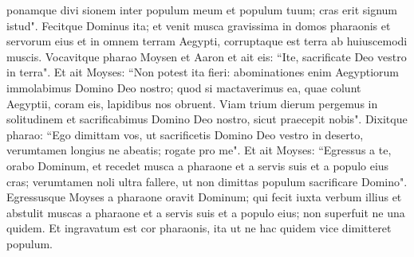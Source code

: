 \begin{biblechapter}
\verse ponamque divi sionem inter populum meum et populum tuum; cras erit signum istud". 
\verse Fecitque Dominus ita; et venit musca gravissima in domos pharaonis et servorum eius et in omnem terram Aegypti, corruptaque est terra ab huiuscemodi muscis. 
\verse Vocavitque pharao Moysen et Aaron et ait eis: “Ite, sacrificate Deo vestro in terra". 
\verse Et ait Moyses: “Non potest ita fieri: abominationes enim Aegyptiorum immolabimus Domino Deo nostro; quod si mactaverimus ea, quae colunt Aegyptii, coram eis, lapidibus nos obruent. 
\verse Viam trium dierum pergemus in solitudinem et sacrificabimus Domino Deo nostro, sicut praecepit nobis". 
\verse Dixitque pharao: “Ego dimittam vos, ut sacrificetis Domino Deo vestro in deserto, verumtamen longius ne abeatis; rogate pro me". 
\verse Et ait Moyses: “Egressus a te, orabo Dominum, et recedet musca a pharaone et a servis suis et a populo eius cras; verumtamen noli ultra fallere, ut non dimittas populum sacrificare Domino". 
\verse Egressusque Moyses a pharaone oravit Dominum;  
\verse qui fecit iuxta verbum illius et abstulit muscas a pharaone et a servis suis et a populo eius; non superfuit ne una quidem. 
\verse Et ingravatum est cor pharaonis, ita ut ne hac quidem vice dimitteret populum. 
\end{biblechapter}

